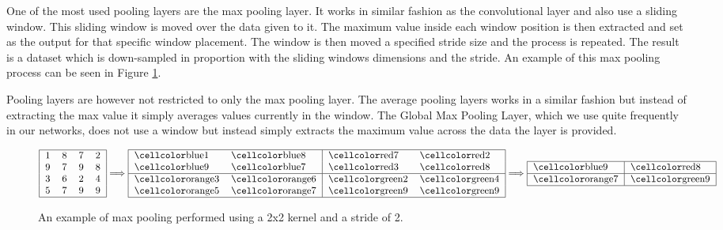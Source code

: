\begin{description}
        One of the most used pooling layers are the max pooling layer. It works
        in similar fashion as the convolutional layer and also use a sliding
        window. This sliding window is moved over the data given to it. The
        maximum value inside each window position is then extracted and set as
        the output for that specific window placement. The window is then moved
        a specified stride size and the process is repeated. The result is a
        dataset which is down-sampled in proportion with the sliding windows
        dimensions and the stride. An example of this max pooling process can
        be seen in Figure \ref{fig:max_pool}.

        Pooling layers are however not restricted to only the max pooling layer.
        The average pooling layers works in a similar fashion but instead of
        extracting the max value it simply averages values currently in the
        window. The Global Max Pooling Layer, which we use quite frequently in
        our networks, does not use a window but instead simply extracts the
        maximum value across the data the layer is provided.

        \begin{figure}
        \centering
        \begin{equation}
            \begin{tabular}{|llll|}
            \hline
            1 & 8 & 7 & 2 \\
            9 & 7 & 9 & 8 \\
            3 & 6 & 2 & 4 \\
            5 & 7 & 9 & 9 \\\hline
            \end{tabular}
                \Longrightarrow
            \begin{tabular}{|ll|ll|}
            \hline
            \cc{blue}1 & \cc{blue}8 & \cc{red}7 & \cc{red}2 \\
            \cc{blue}9 & \cc{blue}7 & \cc{red}3 & \cc{red}8 \\ \hline
            \cc{orange}3 & \cc{orange}6 & \cc{green}2 & \cc{green}4 \\
            \cc{orange}5 & \cc{orange}7 & \cc{green}9 & \cc{green}9\\
            \hline
            \end{tabular}
                \Longrightarrow
            \begin{tabular}{|l|l|}
            \hline
            \cc{blue}9 & \cc{red}8\\\hline
            \cc{orange}7 & \cc{green}9\\
            \hline
            \end{tabular}
        \end{equation}
        \caption{An example of max pooling performed using a 2x2 kernel and a
            stride of 2.}
        \label{fig:max_pool}
        \end{figure}



\end{description}
